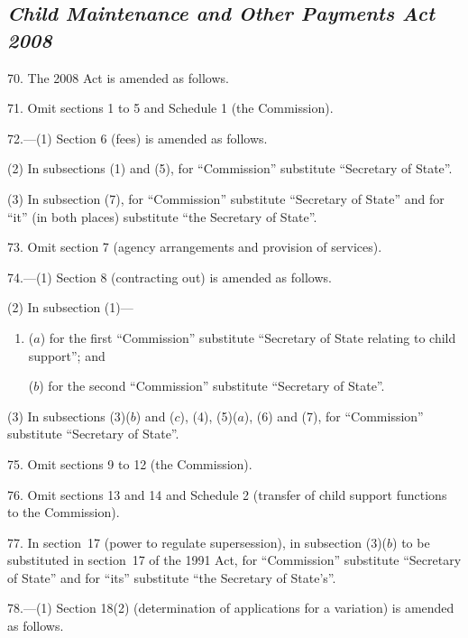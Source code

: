 \documentclass[12pt,a4paper]{article}
\begin{document}
\subsection*{\itshape Child Maintenance and Other Payments Act 2008}

70.  The 2008 Act is amended as follows.

\medskip

71.  Omit sections 1 to 5 and Schedule 1 (the Commission).

\medskip

72.---(1)  Section 6 (fees) is amended as follows.

(2) In subsections (1) and (5), for “Commission” substitute “Secretary of State”.

(3) In subsection (7), for “Commission” substitute “Secretary of State” and for “it” (in both places) substitute “the Secretary of State”.

\medskip

73.  Omit section 7 (agency arrangements and provision of services).

\medskip

74.---(1)  Section 8 (contracting out) is amended as follows.

(2) In subsection (1)—
\begin{enumerate}\item[]
($a$) for the first “Commission” substitute “Secretary of State relating to child support”; and

($b$) for the second “Commission” substitute “Secretary of State”.
\end{enumerate}

(3) In subsections (3)($b$)  and ($c$), (4), (5)($a$), (6) and (7), for “Commission” substitute “Secretary of State”.

\medskip

75.  Omit sections 9 to 12 (the Commission).

\medskip

76.  Omit sections 13 and 14 and Schedule 2 (transfer of child support functions to the Commission).

\medskip

77.  In section~17 (power to regulate supersession), in subsection (3)($b$)  to be substituted in section~17 of the 1991 Act, for “Commission” substitute “Secretary of State” and for “its” substitute “the Secretary of State’s”.

\medskip

78.---(1)  Section 18(2) (determination of applications for a variation) is amended as follows.
\end{document}
